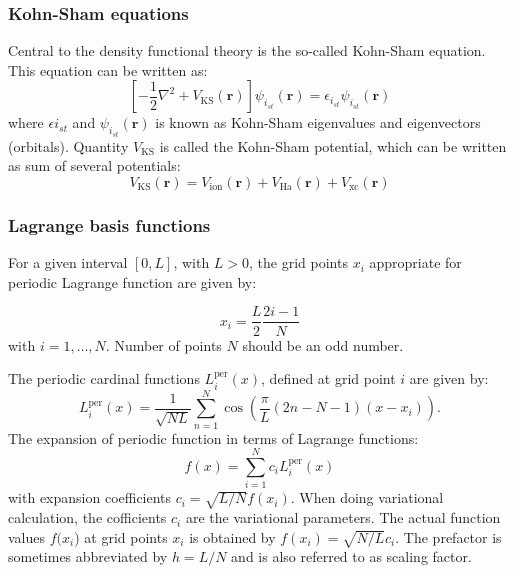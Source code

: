 \documentclass[8pt]{beamer}
\begin{document}
\begin{frame}
\frametitle{Kohn-Sham equations}

Central to the density functional theory is the so-called Kohn-Sham
equation.
This equation can be written as:
\begin{equation}
\left[
-\frac{1}{2}\nabla^2  + V_{\mathrm{KS}}(\mathbf{r})
\right] \psi_{i_{st}}(\mathbf{r}) =
\epsilon_{i_{st}}\psi_{i_{st}}(\mathbf{r})
\end{equation}
where $\epsilon{i_{st}}$ and $\psi_{i_{st}}(\mathbf{r})$ is known as Kohn-Sham
eigenvalues and eigenvectors (orbitals).
Quantity $V_{\mathrm{KS}}$ is called the Kohn-Sham potential, which can be
written as sum of several potentials:
\begin{equation}
V_{\mathrm{KS}}(\mathbf{r}) = V_{\mathrm{ion}}(\mathbf{r}) + V_{\mathrm{Ha}}(\mathbf{r})
+ V_{\mathrm{xc}}(\mathbf{r})
\label{eq:KS-pot}
\end{equation}

\end{frame}




\begin{frame}
\frametitle{Lagrange basis functions}

For a given interval $[0,L]$, with $L>0$, the grid points $x_{i}$
appropriate for periodic Lagrange function are given by:

\begin{equation}
x_{i}=\frac{L}{2}\frac{2i-1}{N}
\end{equation}
with $i=1,\ldots,N$. Number of points $N$ should be an odd number.

The periodic cardinal functions $L_{i}^{\mathrm{per}}(x)$, defined
at grid point $i$ are given by:
\begin{equation}
L_{i}^{\mathrm{per}}(x)=\frac{1}{\sqrt{NL}}\sum_{n=1}^{N}\cos\left(\frac{\pi}{L}(2n-N-1)(x-x_{i})\right).
\end{equation}
The expansion of periodic function in terms of Lagrange functions:
\begin{equation}
f(x)=\sum_{i=1}^{N}c_{i}L_{i}^{\mathrm{per}}(x)
\end{equation}
with expansion coefficients $c_{i}=\sqrt{L/N}f(x_{i})$. When doing
variational calculation, the cofficients $c_{i}$ are the variational
parameters. The actual function values $f(x_{i}$) at grid points
$x_{i}$ is obtained by $f(x_{i})=\sqrt{N/L}c_{i}$. The prefactor
is sometimes abbreviated by $h=L/N$ and is also referred to as scaling
factor.

\end{frame}
\end{document}
